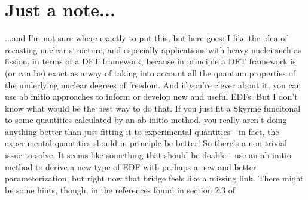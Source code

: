 \section*{Just a note...}
...and I'm not sure where exactly to put this, but here goes: I like the idea of recasting nuclear structure, and especially applications with heavy nuclei such as fission, in terms of a DFT framework, because in principle a DFT framework is (or can be) exact as a way of taking into account all the quantum properties of the underlying nuclear degrees of freedom. And if you're clever about it, you can use ab initio approaches to inform or develop new and useful EDFs. But I don't know what would be the best way to do that. If you just fit a Skyrme funcitonal to some quantities calculated by an ab initio method, you really aren't doing anything better than just fitting it to experimental quantities - in fact, the experimental quantities should in principle be better! So there's a non-trivial issue to solve. It seems like something that should be doable - use an ab initio method to derive a new type of EDF with perhaps a new and better parameterization, but right now that bridge feels like a missing link. There might be some hints, though, in the references found in section 2.3 of \cite{Schunck2015error_analysis}

%